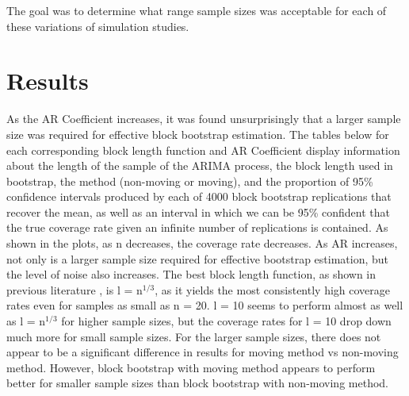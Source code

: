 \documentclass[12pt, letterpaper, titlepage]{article}
\begin{document}
The goal was to determine what range sample sizes was acceptable for each of these variations of simulation studies.



 

\section{Results}
\label{sec:results}

As the AR Coefficient increases, it was found unsurprisingly that a larger sample size was 
required for effective block bootstrap estimation. The tables below for each corresponding block length function and AR Coefficient display information about the length of the sample of the ARIMA process, the block length used in bootstrap, the method (non-moving or moving), and the proportion of 95\% confidence intervals produced by each of 4000 block bootstrap replications that recover the mean, as well as an interval in which we can be 95\% confident that the true coverage rate given an infinite number of replications is contained. 
As shown in the plots, as n decreases, the coverage rate decreases. As AR increases, not only is a larger sample size required for effective bootstrap estimation, but the level of noise also increases. The best block length function, as shown in previous literature \citep{buhlmann1999block}, is l = n$^{1/3}$, as it yields the most consistently high coverage rates even for samples as small as n = 20. l = 10 seems to perform almost as well as l = n$^{1/3}$ for higher sample sizes, but the coverage rates for l = 10 drop down much more for small sample sizes. For the larger sample sizes, there does not appear to be a significant difference in results for moving method vs non-moving method. However, block bootstrap with moving method appears to perform better for smaller sample sizes than block bootstrap with non-moving method.
\end{document}
